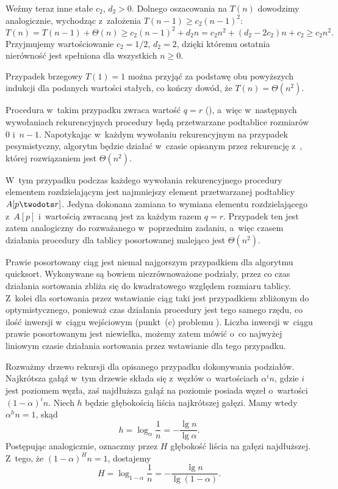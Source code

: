 Weźmy teraz inne stałe $c_2$, $d_2>0$. Dolnego oszacowania na $T(n)$ dowodzimy analogicznie, wychodząc z~założenia $T(n-1)\ge c_2(n-1)^2$:
\[
	T(n) = T(n-1)+\Theta(n) \ge c_2(n-1)^2+d_2n = c_2n^2+(d_2-2c_2)n+c_2 \ge c_2n^2.
\]
Przyjmujemy wartościowanie $c_2=1/2$, $d_2=2$, dzięki któremu ostatnia nierówność jest spełniona dla wszystkich $n\ge0$.

Przypadek brzegowy $T(1)=1$ można przyjąć za podstawę obu powyższych indukcji dla podanych wartości stałych, co kończy dowód, że $T(n)=\Theta(n^2)$.

\exercise %
Procedura  w~takim przypadku zwraca wartość $q=r$ (), a~więc w~następnych wywołaniach rekurencyjnych procedury  będą przetwarzane podtablice rozmiarów 0 i~$n-1$. Napotykając w~każdym wywołaniu rekurencyjnym na przypadek pesymistyczny, algorytm będzie działać w~czasie opisanym przez rekurencję z~, której rozwiązaniem jest $\Theta(n^2)$.

\exercise %
W~tym przypadku podczas każdego wywołania rekurencyjnego procedury  elementem rozdzielającym jest najmniejszy element przetwarzanej podtablicy $A[p\twodots r]$. Jedyna dokonana zamiana to wymiana elementu rozdzielającego z~$A[p]$ i~wartością zwracaną jest za każdym razem $q=r$. Przypadek ten jest zatem analogiczny do rozważanego w~poprzednim zadaniu, a~więc czasem działania procedury  dla tablicy posortowanej malejąco jest $\Theta(n^2)$.

\exercise %
Prawie posortowany ciąg jest niemal najgorszym przypadkiem dla algorytmu quicksort. Wykonywane są bowiem niezrównoważone podziały, przez co czas działania sortowania zbliża się do kwadratowego względem rozmiaru tablicy. Z~kolei dla sortowania przez wstawianie ciąg taki jest przypadkiem zbliżonym do optymistycznego, ponieważ czas działania procedury  jest tego samego rzędu, co ilość inwersji w~ciągu wejściowym (punkt~(c) problemu ). Liczba inwersji w~ciągu prawie posortowanym jest niewielka, możemy zatem mówić o~co najwyżej liniowym czasie działania sortowania przez wstawianie dla tego przypadku.

\exercise %
Rozważmy drzewo rekursji dla opisanego przypadku dokonywania podziałów. Najkrótsza gałąź w~tym drzewie składa się z~węzłów o~wartościach $\alpha^in$, gdzie $i$ jest poziomem węzła, zaś najdłuższa gałąź na  poziomie posiada węzeł o~wartości $(1-\alpha)^in$. Niech $h$ będzie głębokością liścia najkrótszej gałęzi. Mamy wtedy $\alpha^hn=1$, skąd
\[
	h = \log_\alpha\frac{1}{n} = -\frac{\lg n}{\lg\alpha}.
\]
Postępując analogicznie, oznaczmy przez $H$ głębokość liścia na gałęzi najdłuższej. Z~tego, że $(1-\alpha)^Hn=1$, dostajemy
\[
	H = \log_{1-\alpha}\frac{1}{n} = -\frac{\lg n}{\lg(1-\alpha)}.
\]

